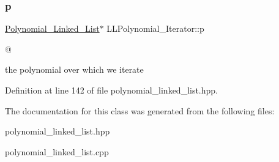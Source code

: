 \subsubsection{\texorpdfstring{p}{p}}
{\footnotesize\ttfamily \hyperlink{class_polynomial___linked___list}{Polynomial\+\_\+\+Linked\+\_\+\+List}$\ast$ L\+L\+Polynomial\+\_\+\+Iterator\+::p\hspace{0.3cm}{\ttfamily [protected]}}



@ 

the polynomial over which we iterate 

Definition at line 142 of file polynomial\+\_\+linked\+\_\+list.\+hpp.



The documentation for this class was generated from the following files\+:\begin{DoxyCompactItemize}
\item 
polynomial\+\_\+linked\+\_\+list.\+hpp\item 
polynomial\+\_\+linked\+\_\+list.\+cpp\end{DoxyCompactItemize}
